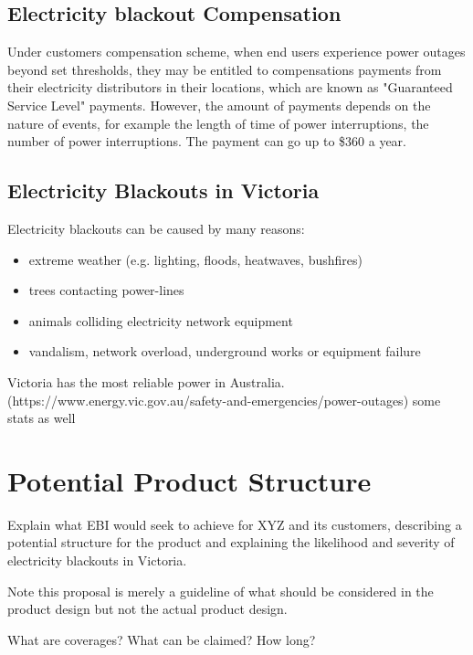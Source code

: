 \documentclass[12pt]{article}
\begin{document}
\subsection{Electricity blackout Compensation}
\begin{flushleft}
Under customers compensation scheme, when end users experience power outages beyond set thresholds, they may be entitled to compensations payments from their electricity distributors in their locations, which are known as "Guaranteed Service Level" payments. However, the amount of payments depends on the nature of events, for example the length of time of power interruptions, the number of power interruptions. The payment can go up to \$360 a year.\parencite{cc} \par 
\end{flushleft}

\subsection{Electricity Blackouts in Victoria}
\begin{flushleft}
Electricity blackouts can be caused by many reasons:
\begin{itemize}
 \item extreme weather (e.g. lighting, floods, heatwaves, bushfires)
 \item trees contacting power-lines
 \item animals colliding electricity network equipment
 \item vandalism, network overload, underground works or equipment failure\parencite{eb2}\parencite{eb1}
\end{itemize}
Victoria has the most reliable power in Australia.(https://www.energy.vic.gov.au/safety-and-emergencies/power-outages)
some stats as well
\end{flushleft}
\newpage


\section{Potential Product Structure}
\begin{flushleft}
Explain what EBI would seek to achieve for XYZ and its customers, describing a potential structure for the product and explaining the likelihood and severity of electricity blackouts in Victoria.\par
Note this proposal is merely a guideline of what should be considered in the product design but not the actual product design. \par

What are coverages? What can be claimed? How long?  
\end{flushleft}
\end{document}
